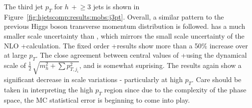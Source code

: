 The third jet $p_T$ for $h\,+\!\ge\!\!3$ jets is shown in
Figure~\ref{fig:hjetscomp:results:mobs:j3pt}. Overall, a similar pattern to the
previous Higgs boson transverse momentum distribution is followed. \hjetscompSherpa
\hjetscompMEPSatNLO has a much smaller scale uncertainty than \hjetscompMGaMC, which mirrors 
the small scale uncertainty of the NLO \hjetscompGoSam{}+\hjetscompSherpa calculation. The fixed
order \hjetscompGoSam{}+\hjetscompSherpa results show more than a 50\% increase over \hjetscompPowheg at large
$p_T$.  The close agreement between central values of \hjetscompGoSam{}+\hjetscompSherpa using the
dynamical scale of $\tfrac{1}{2}\,\sqrt{m_{h}^2+\sum p_{T,j_i}^2}$, and \hjetscompMinlo
is somewhat suprising. The \hjetscompMinlo results again show a significant decrease in
scale variations - particularly at high $p_T$. Care
should be taken in interpreting the high $p_T$ region since due to the
complexity of the phase space, the MC statistical error is beginning to come into
play.

